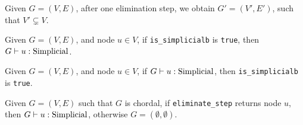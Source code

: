 
\begin{theorem}
    Given $G = (V, E)$, after one elimination step, we obtain $G'=(V', E')$, such that $V' \subsetneq V$. \Coqed
\end{theorem}

\pause

\begin{lemma}
    Given $G = (V, E)$, and node $u \in V$, if \texttt{is\_simplicialb} is \texttt{true}, then $\simplicial{u}{G}$. \Coqed
\end{lemma}

\pause

\begin{lemma}
    Given $G = (V, E)$, and node $u \in V$, if $\simplicial{u}{G}$, then \texttt{is\_simplicialb} is \texttt{true}. \Coqed
\end{lemma}

\pause

\begin{theorem}
    Given $G = (V, E)$ such that $G$ is chordal, if \texttt{eliminate\_step} returns node $u$, then $\simplicial{u}{G}$, otherwise $G = (\emptyset, \emptyset)$. \Coqed
\end{theorem}




